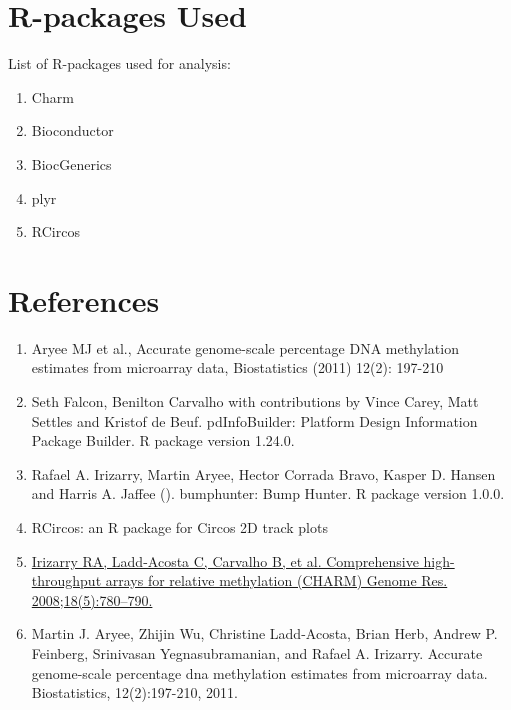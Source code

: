 \documentclass[11pt]{article}
\begin{document}
\section*{R-packages Used}

List of R-packages used for analysis:
\begin{enumerate}[itemsep=-0.2mm]

\item Charm

\item Bioconductor

\item BiocGenerics

\item plyr

\item RCircos


\end{enumerate}




\section*{References}  
\begin{enumerate}


	\item  Aryee MJ et al., Accurate genome-scale percentage DNA methylation estimates
	  from microarray data, Biostatistics (2011) 12(2): 197-210 	

	\item  Seth Falcon, Benilton Carvalho with contributions by Vince Carey, Matt
	  Settles and Kristof de Beuf. pdInfoBuilder: Platform Design Information
	  Package Builder. R package version 1.24.0.
	
	\item   Rafael A. Irizarry, Martin Aryee, Hector Corrada Bravo, Kasper D. Hansen and	Harris A. Jaffee (). bumphunter: Bump Hunter. R package version 1.0.0.
		
	\item RCircos: an R package for Circos 2D track plots
	


	\item \href{http://www.ncbi.nlm.nih.gov/pmc/articles/PMC2336799/}{Irizarry RA, Ladd-Acosta C, Carvalho B, et al. Comprehensive high-throughput arrays for relative methylation (CHARM) Genome Res. 2008;18(5):780–790.} 
	
	\item Martin J. Aryee, Zhijin Wu, Christine Ladd-Acosta, Brian Herb, Andrew P.
Feinberg, Srinivasan Yegnasubramanian, and Rafael A. Irizarry. Accurate
genome-scale percentage dna methylation estimates from microarray data.
Biostatistics, 12(2):197-210, 2011.

\end{enumerate}

 
 
 
 
 
\end{document}
